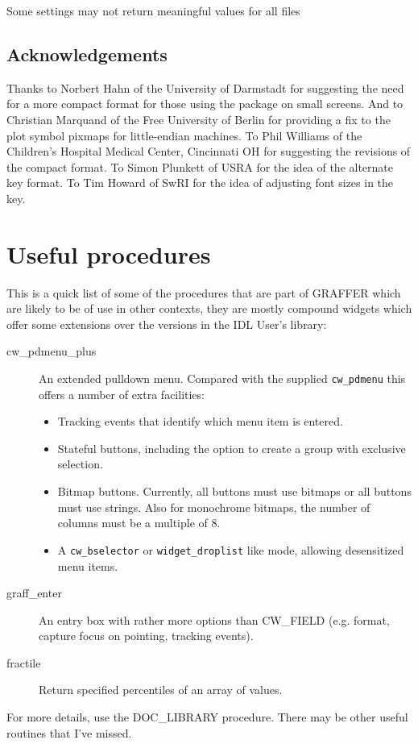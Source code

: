 \documentclass[11pt,twoside,english]{article}
\begin{document}
 
 	Some settings may not return meaningful values for all files



\subsection*{Acknowledgements}

Thanks to Norbert Hahn of the University of Darmstadt for suggesting
the need for a more compact format for those using the package on small
screens. And to Christian Marquand of the Free University of Berlin for
providing a fix to the plot symbol pixmaps for little-endian
machines. To Phil Williams of the Children's Hospital Medical Center,
Cincinnati OH for suggesting the revisions of the compact format. To
Simon Plunkett of USRA for the idea of the alternate key format. To Tim
Howard of SwRI for the idea of adjusting font sizes in the key.

\appendix

\section{Useful procedures}

This is a quick list of some of the procedures that are part of GRAFFER
which are likely to be of use in other contexts, they are mostly
compound widgets which offer some extensions over the versions in the
IDL User's library:

\begin{description}
\item[cw\_pdmenu\_plus] An extended pulldown menu. Compared with the
  supplied \texttt{cw\_pdmenu} this offers a number of extra
  facilities:
  \begin{itemize}
  \item Tracking events that identify which menu item is entered.
  \item Stateful buttons, including the option to create a group with
    exclusive selection.
  \item Bitmap buttons. Currently, all buttons must use bitmaps or all
    buttons must use strings. Also for monochrome bitmaps, the number
    of columns must be a multiple of 8.
  \item A \texttt{cw\_bselector} or \texttt{widget\_droplist} like
    mode, allowing desensitized menu items.
  \end{itemize}
\item [graff\_enter]An entry box with rather more options than
  CW\_FIELD (e.g. format, capture focus on pointing, tracking events).
\item [fractile]Return specified percentiles of an array of values.
\end{description}
For more details, use the DOC\_LIBRARY procedure. There may be other
useful routines that I've missed.
\end{document}
